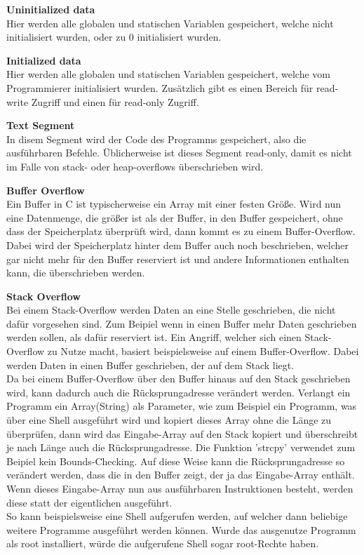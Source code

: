 \documentclass[12pt,a4paper]{article}
\begin{document}
\textbf{Uninitialized data}\\
Hier werden alle globalen und statischen Variablen gespeichert, welche nicht initialisiert wurden, oder 
zu 0 initialisiert wurden.
\bigskip

\textbf{Initialized data}\\
Hier werden alle globalen und statischen Variablen gespeichert, welche vom Programmierer initialisiert 
wurden. 
Zusätzlich gibt es einen Bereich für read-write Zugriff und einen für read-only Zugriff.
\bigskip

\textbf{Text Segment}\\
In disem Segment wird der Code des Programms gespeichert, also die ausführbaren Befehle.
Üblicherweise ist dieses Segment read-only, damit es nicht im Falle von stack- oder heap-overflows 
überschrieben wird.
\bigskip

\textbf{Buffer Overflow}\\
Ein Buffer in C ist typischerweise ein Array mit einer festen Größe. Wird nun eine Datenmenge, die 
größer ist als der Buffer, in den Buffer gespeichert, ohne dass der Speicherplatz überprüft wird, 
dann kommt es zu einem Buffer-Overflow. Dabei wird der Speicherplatz hinter dem Buffer auch noch
beschrieben, welcher gar nicht mehr für den Buffer reserviert ist und andere Informationen enthalten 
kann, die überschrieben werden.
\bigskip

\textbf{Stack Overflow}\\
Bei einem Stack-Overflow werden Daten an eine Stelle geschrieben, die nicht dafür vorgesehen sind. 
Zum Beipiel wenn in einen Buffer mehr Daten geschrieben werden sollen, als dafür reserviert ist.
Ein Angriff, welcher sich einen Stack-Overflow zu Nutze macht, basiert beispielsweise auf einem 
Buffer-Overflow. Dabei werden Daten in einen Buffer geschrieben, der auf dem Stack liegt.\\
Da bei einem Buffer-Overflow über den Buffer hinaus auf den Stack geschrieben wird, kann dadurch auch 
die Rücksprungadresse verändert werden. 
Verlangt ein Programm ein Array(String) als Parameter, wie zum Beispiel ein Programm, was über eine Shell
ausgeführt wird und kopiert dieses Array ohne die Länge zu überprüfen, dann wird das Eingabe-Array auf 
den Stack kopiert und überschreibt je nach Länge auch die Rücksprungadresse. Die Funktion 'strcpy' 
verwendet zum Beipiel kein Bounds-Checking.
Auf diese Weise kann die Rücksprungadresse so verändert werden, dass die in den Buffer zeigt, der ja 
das Eingabe-Array enthält. Wenn dieses Eingabe-Array nun aus ausführbaren Instruktionen besteht, werden 
diese statt der eigentlichen ausgeführt.\\
So kann beispielsweise eine Shell aufgerufen werden, auf welcher dann beliebige weitere Programme ausgeführt 
werden können. 
Wurde das ausgenutze Programm als root installiert, würde die aufgerufene Shell sogar root-Rechte haben.
\bigskip
\end{document}
